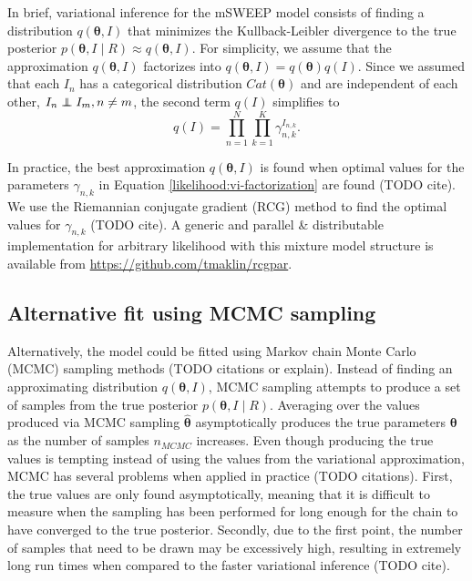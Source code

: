 \documentclass[officiallayout]{tktla}
\newcommand\indept{\protect\mathpalette{\protect\independenT}{\perp}}
\def\independenT#1#2{\mathrel{\rlap{$#1#2$}\mkern2mu{#1#2}}}
\begin{document}
In brief, variational inference for the mSWEEP model consists of
finding a distribution $q\left(\boldsymbol\theta, I\right)$ that
minimizes the Kullback-Leibler divergence to the true posterior
$p\left(\boldsymbol\theta, I \middle| R\right) \approx
q\left(\boldsymbol\theta, I\right)$. For simplicity, we assume that
the approximation $q\left(\boldsymbol\theta, I\right)$ factorizes into
$q\left(\boldsymbol\theta, I\right) =
q\left(\boldsymbol\theta\right)q\left(I\right)$. Since we assumed that
each $I_{n}$ has a categorical distribution
$Cat\left(\boldsymbol\theta\right)$ and are independent of each other,
$I_{n} \indept I_{m}, n \neq m$, the second term $q\left(I\right)$
simplifies to
\begin{equation}
  \label{likelihood:vi-factorization}
  q\left(I\right) = \prod_{n = 1}^N\prod_{k = 1}^K \gamma_{n, k}^{I_{n, k}}.
\end{equation}

In practice, the best approximation $q\left(\boldsymbol\theta,
I\right)$ is found when optimal values for the parameters $\gamma_{n,
  k}$ in Equation \ref{likelihood:vi-factorization} are found (TODO
cite). We use the Riemannian conjugate gradient (RCG) method to find
the optimal values for $\gamma_{n, k}$ (TODO cite). A generic and
parallel \& distributable implementation for arbitrary likelihood with
this mixture model structure is available from
\url{https://github.com/tmaklin/rcgpar}.

\subsection{Alternative fit using MCMC sampling}
Alternatively, the model could be fitted using Markov chain Monte
Carlo (MCMC) sampling methods (TODO citations or explain). Instead of
finding an approximating distribution $q\left(\boldsymbol\theta,
I\right)$, MCMC sampling attempts to produce a set of samples from the
true posterior $p\left(\boldsymbol\theta, I\middle|
R\right)$. Averaging over the values produced via MCMC sampling
$\hat{\boldsymbol\theta}$ asymptotically produces the true parameters
$\boldsymbol\theta$ as the number of samples $n_{MCMC}$
increases. Even though producing the true values is tempting instead
of using the values from the variational approximation, MCMC has
several problems when applied in practice (TODO citations). First, the
true values are only found asymptotically, meaning that it is
difficult to measure when the sampling has been performed for long
enough for the chain to have converged to the true
posterior. Secondly, due to the first point, the number of samples
that need to be drawn may be excessively high, resulting in extremely
long run times when compared to the faster variational inference (TODO
cite).
\end{document}
